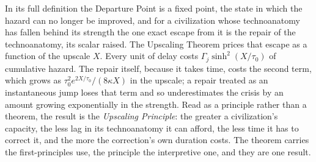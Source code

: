 \noindent In its full definition the Departure Point is a fixed point, the
state in which the hazard can no longer be improved, and for a
civilization whose technoanatomy has fallen behind its strength the one
exact escape from it is the repair of the technoanatomy, its scalar
raised. The Upscaling Theorem prices that escape as a function of the
upscale $X$. Every unit of delay costs $\Gamma_j\sinh^2(X/\tau_0)$ of
cumulative hazard. The repair itself, because it takes time, costs the
second term, which grows as $\tau_0^2e^{2X/\tau_0}/(8\kappa X)$ in the
upscale; a repair treated as an instantaneous jump loses that term and so
underestimates the crisis by an amount growing exponentially in the
strength. Read as a principle rather than a theorem, the result is the
\emph{Upscaling Principle}: the greater a civilization's capacity, the
less lag in its technoanatomy it can afford, the less time it has to
correct it, and the more the correction's own duration costs. The theorem
carries the first-principles use, the principle the interpretive one, and
they are one result.
